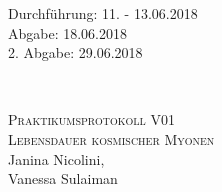 



\begin{titlepage}
  \begin{flushleft}
 Durchführung: 11. - 13.06.2018\\
 Abgabe: 18.06.2018\\
 2. Abgabe: 29.06.2018
  \end{flushleft}


\HRule\\[1,0cm]

 \begin{center}


\textsc{\LARGE Praktikumsprotokoll V01}\\[1.5cm]
\textsc{\huge Lebensdauer kosmischer Myonen} \\[5,5cm]

Janina Nicolini\footnotemark[1], \\
Vanessa Sulaiman\footnotemark[2] \\[1,0cm]



 \end{center}
\HRule

 \vfill

\end{titlepage}






\printbibliography


